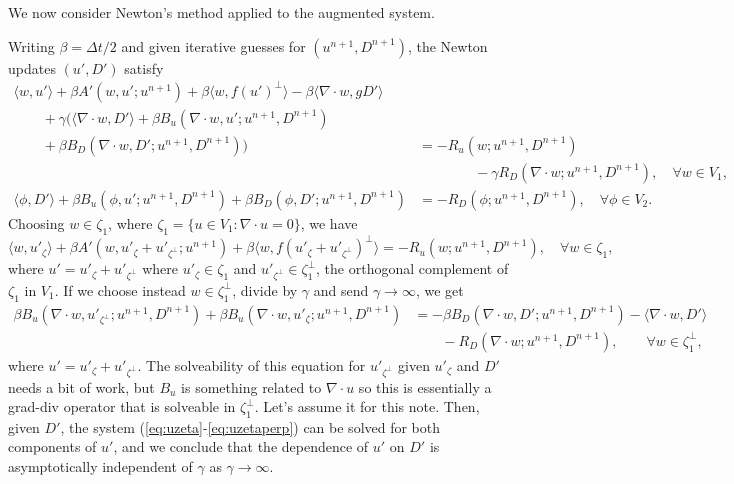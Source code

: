 \documentclass{article}
\begin{document}
We now consider Newton's method applied to the augmented system.

Writing $\beta=\Delta t/2$ and given iterative guesses for
$(u^{n+1},D^{n+1})$, the Newton updates $(u',D')$ satisfy
\begin{align}
  \nonumber
  \langle w, u' \rangle + \beta A'(w, u'; u^{n+1})
  + \beta\langle w, f(u')^{\perp}\rangle
  - \beta\langle \nabla\cdot w, gD'\rangle & \\
  \nonumber
  \qquad + \gamma\Big(
  \langle \nabla\cdot w, D' \rangle
  + \beta B_u(\nabla\cdot w, u'; u^{n+1},D^{n+1}) & \\
  \nonumber
  \qquad  + \beta B_D(\nabla\cdot w, D'; u^{n+1},D^{n+1})
  \Big)
  & = -R_u(w;u^{n+1},D^{n+1}) \\
  & \qquad \qquad - \gamma R_D(\nabla\cdot w;
  u^{n+1},D^{n+1}), \quad \forall w \in V_1, \\
  \langle \phi, D' \rangle
  + \beta B_u(\phi, u'; u^{n+1},D^{n+1})
  + \beta B_D(\phi, D'; u^{n+1},D^{n+1})
  & = -R_D(\phi; u^{n+1},D^{n+1}), \quad \forall \phi\in V_2.
\end{align}
Choosing $w \in \zeta_1$, where $\zeta_1=\{u\in V_1:\nabla\cdot u=0\}$,
we have
\begin{equation}
  \langle w, u'_\zeta\rangle + \beta A'(w,u'_\zeta + u'_{\zeta^\perp}; u^{n+1})
  + \beta\langle w, f(u'_\zeta + u'_{\zeta^\perp})^\perp\rangle = -R_u(w; u^{n+1},D^{n+1}),
  \quad \forall w\in \zeta_1,
\label{eq:uzeta}
\end{equation}
where $u'=u'_\zeta+u'_{\zeta^\perp}$ where $u'_\zeta\in \zeta_1$ and
$u'_{\zeta^{\perp}}\in \zeta_1^\perp$, the orthogonal complement of
$\zeta_1$ in $V_1$. If we choose instead $w\in \zeta_1^\perp$,
divide by $\gamma$ and send $\gamma\to \infty$, we get
\begin{align}
  \nonumber
   \beta B_u(\nabla\cdot w, u'_{\zeta^\perp}; u^{n+1},D^{n+1})  
  + \beta B_u(\nabla\cdot w, u'_\zeta; u^{n+1},D^{n+1}) & = 
  - \beta B_D(\nabla\cdot w, D'; u^{n+1},D^{n+1}) -\langle \nabla\cdot w, D' \rangle \\
  & \qquad -R_D(\nabla\cdot w;u^{n+1},D^{n+1}), \qquad \forall w \in \zeta_1^\perp,
\label{eq:uzetaperp}
\end{align}
where $u' = u'_{\zeta} + u'_{\zeta^\perp}$.  The solveability of this
equation for $u'_{\zeta^\perp}$ given $u'_{\zeta}$ and $D'$ needs a
bit of work, but $B_u$ is something related to $\nabla\cdot u$ so this
is essentially a grad-div operator that is solveable in
$\zeta^{\perp}_1$. Let's assume it for this note. Then, given $D'$, the
system (\ref{eq:uzeta}-\ref{eq:uzetaperp}) can be solved for both
components of $u'$, and we conclude that the dependence of $u'$ on
$D'$ is asymptotically independent of $\gamma$ as $\gamma\to \infty$.
\end{document}
